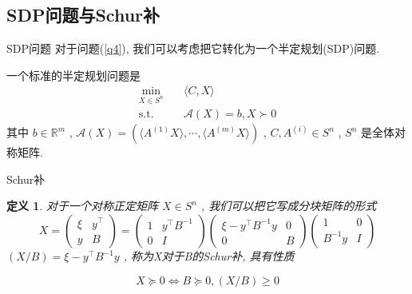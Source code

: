 \documentclass[slidestop, compress, mathserif, UTF8]{beamer}
\newtheorem{define}{\bf \textcolor[rgb]{0.8,0,0}{定义}}[section]
\numberwithin{equation}{section}                                        %
\begin{document}
        \subsection{SDP问题与Schur补}
            \begin{frame}[t]{SDP问题}
                对于问题(\ref{q4}), 我们可以考虑把它转化为一个半定规划(SDP)问题.

                一个标准的半定规划问题是
                \begin{equation}
                    \begin{split}\label{SDP}
                        \min_{X \in S^n} \quad
                            & \langle{C, X}\rangle\\
                        \text{s.t.} \quad
                            & \mathcal{A}(X) = b, X \succ 0
                    \end{split}
                \end{equation}
                \small{其中 $b \in \mathbb{R}^{m}$ , $\mathcal{A}(X) = (\langle{A^{(1)} X}\rangle, \cdots, \langle{A^{(m)} X}\rangle)$ , $C, A^{(i)}\in S^n$ , $S^n$ 是全体对称矩阵.}\normalsize
            \end{frame}
            \begin{frame}[t]{Schur补}
                \begin{define}
                    对于一个对称正定矩阵 $X \in S^n$ , 我们可以把它写成分块矩阵的形式
                    \begin{equation}
                            X
                        =	\begin{pmatrix}
                                \xi & y^\top \\
                                y & B
                            \end{pmatrix}
                        =	\begin{pmatrix}
                                1 & y^\top B^{-1} \\
                                0 & I
                            \end{pmatrix}
                            \begin{pmatrix}
                                \xi - y^\top B^{-1} y & 0 \\
                                0 & B
                            \end{pmatrix}
                            \begin{pmatrix}
                                1 & 0 \\
                                B^{-1} y & I
                            \end{pmatrix}
                    \end{equation}
                    $(X/B) = \xi - y^\top B^{-1} y$ , 称为X对于B的Schur补, 具有性质

                    \begin{equation}\label{SchurCondition}
                        X \succeq 0 \Leftrightarrow B \succeq 0, (X/B) \geq 0
                    \end{equation}
                \end{define}
            \end{frame}
\end{document}
